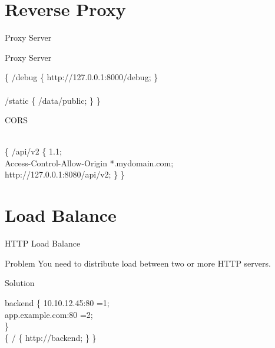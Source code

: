 \documentclass{beamer}
\begin{document}
\section{Reverse Proxy\cite{dejonghe2017nginx}}
\begin{frame}{Proxy Server}

\begin{block}{Proxy Server}
\vspace{0.01\textheight}
\scriptsize
\begin{Alms*}
 \{ \NI
{} /debug \{ \NI
	 http://127.0.0.1:8000/debug;
\ND \}
\\
\\
 /static \{ \NI
	 /data/public;
\ND \}
\ND \}
\\
	
\end{Alms*}
\end{block}

\begin{block}{CORS}
\vspace{0.01\textheight}
\scriptsize
\begin{Alms*}
\\
 \{ \NI
{} /api/v2 \{ \NI
{} 1.1; \\
 Access-Control-Allow-Origin *.mydomain.com; \\
 http://127.0.0.1:8080/api/v2; 
\ND \}
\ND \}
\\
\end{Alms*}
\end{block}

\end{frame}

\section{Load Balance}
\begin{frame}{HTTP Load Balance}
\begin{minipage}[t]{0.8\textwidth}
	\begin{block}{Problem}
		\scriptsize
		\vspace{0.01\textheight}
		You need to distribute load between two or more HTTP servers.
	\end{block}

	\begin{block}{Solution}
		\vspace{0.01\textheight}
		\scriptsize
		\begin{Alms*}
			 backend \{ \NI
			 10.10.12.45:80		=1; \\
			 app.example.com:80	=2; \\
			\ND \} \\
			 \{ \NI
			 / \{ \NI
			 http://backend;
			\ND \}
			\ND \}
		\end{Alms*}
	\end{block}
\end{minipage}
\end{frame}
\end{document}
